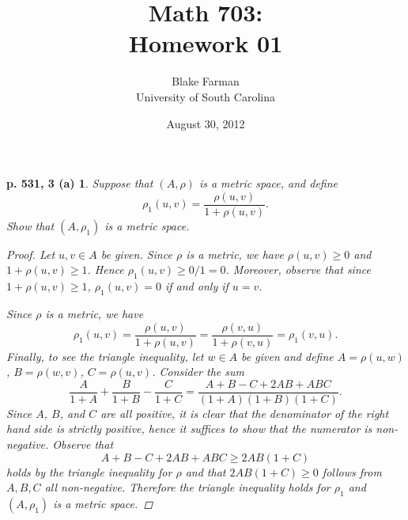 \documentclass[10pt]{amsart}
\author{Blake Farman\\University of South Carolina}
\title{Math 703:\\Homework 01}
\date{August 30, 2012}
\begin{document}
\maketitle

\providecommand{\norm}[1]{\lVert#1\rVert}
\renewcommand{\qedsymbol}{\ensuremath{\blacksquare}}
\newcommand{\abs}[1]{\left| #1 \right|}

\newtheorem*{ex3a}{p. 531, 3 (a)}
\newtheorem*{ex4}{p. 531, 4}
\newtheorem*{ex13}{p. 532, 13}
\newtheorem*{ex25}{p. 535, 25}

\begin{ex3a}
	Suppose that $(A,\rho)$ is a metric space, and define 
		$$\rho_1(u,v) = \frac{\rho(u,v)}{1 + \rho(u,v)}.$$
	Show that $(A, \rho_1)$ is a metric space.
	
	\begin{proof}
	Let $u,v \in A$ be given.
		Since $\rho$ is a metric, we have $\rho(u,v) \geq 0$ and $1 + \rho(u,v) \geq 1$.
		Hence $\rho_1(u,v) \geq 0 / 1 = 0$.
		Moreover, observe that since $1 + \rho(u,v) \geq 1$, $\rho_1(u,v) = 0$ if and only if $u = v$.
		
		Since $\rho$ is a metric, we have
			$$\rho_1(u,v) = \frac{\rho(u,v)}{1 + \rho(u,v)} = \frac{\rho(v,u)}{1 + \rho(v,u)} = \rho_1(v,u).$$
		Finally, to see the triangle inequality, let $w \in A$ be given and define $A = \rho(u,w)$, $B = \rho(w,v)$, $C = \rho(u,v)$.
		Consider the sum
			$$ \frac{A}{1+A} + \frac{B}{1 + B} - \frac{C}{1+C} = \frac{A + B - C + 2AB + ABC}{(1+A)(1+B)(1+C)}.$$
		Since $A$, $B$, and $C$ are all positive, it is clear that the denominator of the right hand side is strictly positive, hence it suffices to show that the numerator is non-negative.
		Observe that $$A + B - C + 2AB + ABC \geq 2AB(1 + C)$$ holds by the triangle inequality for $\rho$ and that $2AB(1+C) \geq 0$ follows from $A,B,C$ all non-negative.
		Therefore the triangle inequality holds for $\rho_1$ and $(A,\rho_1)$ is a metric space.
	\end{proof}
\end{ex3a}
\end{document}

